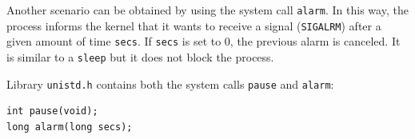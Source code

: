 Another scenario can be obtained by using the system call \texttt{alarm}. In this way, the process informs the kernel that it wants to receive a signal (\texttt{SIGALRM}) after a given amount of time \texttt{secs}. If \texttt{secs} is set to 0, the previous alarm is canceled.
It is similar to a \texttt{sleep} but it does not block the process.

Library \texttt{unistd.h} contains both the system calls \texttt{pause} and \texttt{alarm}:
\begin{verbatim}
int pause(void);
long alarm(long secs);
\end{verbatim}
